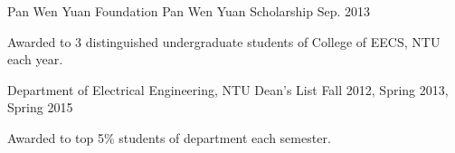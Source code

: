 
\begin{cvhonors}
    \cvhonor
        {Pan Wen Yuan Foundation}
        {Pan Wen Yuan Scholarship}
        {Sep. 2013}
        {}
        { 
            \begin{cvdesc}
                Awarded to 3 distinguished undergraduate students of  College of EECS, NTU each year.
            \end{cvdesc}
        }
    \cvhonor
        {Department of Electrical Engineering, NTU}
        {Dean's List}
        {Fall 2012, Spring 2013, Spring 2015}
        {}
        { 
        \begin{cvdesc}
            Awarded to top 5\% students of department each semester.
        \end{cvdesc}
        }
\end{cvhonors}








